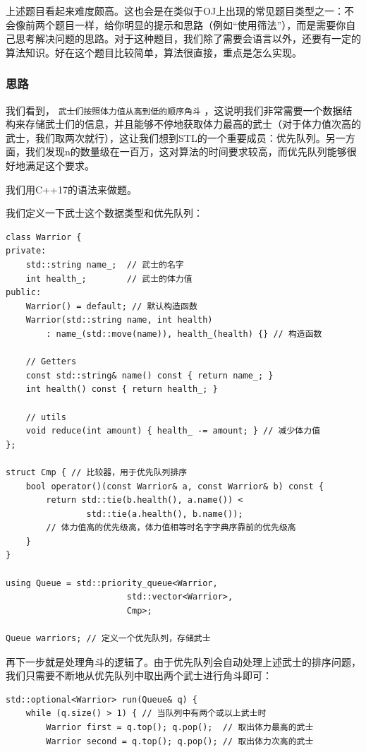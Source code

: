 \begin{answer}
  上述题目看起来难度颇高。这也会是在类似于OJ上出现的常见题目类型之一：不会像前两个题目一样，给你明显的提示和思路（例如“使用筛法”），而是需要你自己思考解决问题的思路。对于这种题目，我们除了需要会语言以外，还要有一定的算法知识。好在这个题目比较简单，算法很直接，重点是怎么实现。

  \subsubsection{思路}
  我们看到， \texttt{武士们按照体力值从高到低的顺序角斗} ，这说明我们非常需要一个数据结构来存储武士们的信息，并且能够不停地获取体力最高的武士（对于体力值次高的武士，我们取两次就行），这让我们想到STL的一个重要成员：优先队列。另一方面，我们发现n的数量级在一百万，这对算法的时间要求较高，而优先队列能够很好地满足这个要求。

  我们用C++17的语法来做题。

  我们定义一下武士这个数据类型和优先队列：
\begin{verbatim}
class Warrior {
private:
    std::string name_;  // 武士的名字
    int health_;        // 武士的体力值
public:
    Warrior() = default; // 默认构造函数
    Warrior(std::string name, int health)
        : name_(std::move(name)), health_(health) {} // 构造函数

    // Getters
    const std::string& name() const { return name_; }
    int health() const { return health_; }

    // utils
    void reduce(int amount) { health_ -= amount; } // 减少体力值
};

struct Cmp { // 比较器，用于优先队列排序
    bool operator()(const Warrior& a, const Warrior& b) const {
        return std::tie(b.health(), a.name()) <
                std::tie(a.health(), b.name());
        // 体力值高的优先级高，体力值相等时名字字典序靠前的优先级高
    }
}

using Queue = std::priority_queue<Warrior,
                        std::vector<Warrior>,
                        Cmp>;

Queue warriors; // 定义一个优先队列，存储武士
\end{verbatim}

  再下一步就是处理角斗的逻辑了。由于优先队列会自动处理上述武士的排序问题，我们只需要不断地从优先队列中取出两个武士进行角斗即可：
\begin{verbatim}
std::optional<Warrior> run(Queue& q) {
    while (q.size() > 1) { // 当队列中有两个或以上武士时
        Warrior first = q.top(); q.pop();  // 取出体力最高的武士
        Warrior second = q.top(); q.pop(); // 取出体力次高的武士


\end{verbatim}
\end{answer}
